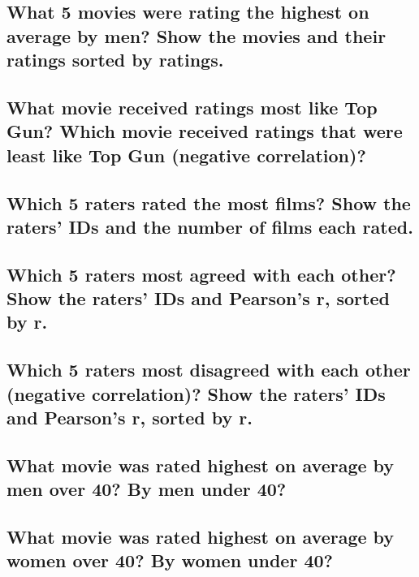 \documentclass{article}
\begin{document}
\subsection{What 5 movies were rating the highest on average by men? Show the movies and their ratings sorted by ratings.}

\subsection{What movie received ratings most like Top Gun? Which movie received ratings that were least like Top Gun (negative correlation)?}

\subsection{Which 5 raters rated the most films? Show the raters' IDs and the number of films each rated.}

\subsection{Which 5 raters most agreed with each other? Show the raters' IDs and Pearson's r, sorted by r.}

\subsection{Which 5 raters most disagreed with each other (negative correlation)? Show the raters' IDs and Pearson's r, sorted by r.}

\subsection{What movie was rated highest on average by men over 40? By men under 40?}

\subsection{What movie was rated highest on average by women over 40? By women under 40?}


\end{document}
